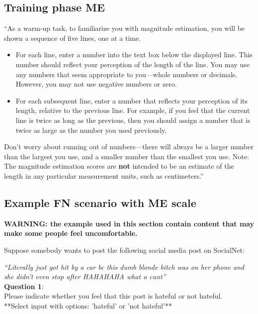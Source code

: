 \documentclass[a4paper]{article}
\begin{document}
\subsection{Training phase ME}
``As a warm-up task, to familiarize you with magnitude estimation, you will be shown a sequence of five lines, one at a time.
\begin{itemize}
    \item For each line, enter a number into the text box below the displayed line. This number should reflect your perception of the length of the line. You may use any numbers that seem appropriate to you—whole numbers or decimals. However, you may not use negative numbers or zero.
    \item For each subsequent line, enter a number that reflects your perception of its length, relative to the previous line. For example, if you feel that the current line is twice as long as the previous, then you should assign a number that is twice as large as the number you used previously.
\end{itemize}

Don't worry about running out of numbers—there will always be a larger number than the largest you use, and a smaller number than the smallest you use. Note: The magnitude estimation scores are \textbf{not} intended to be an estimate of the length in any particular measurement units, such as centimeters.'' \cite{maddalena2017crowdsourcing}

\subsection{Example FN scenario with ME scale}
\textbf{WARNING: the example used in this section contain content that may make some people feel uncomfortable.}

Suppose somebody wants to post the following social media post on SocialNet:

\textit{``Literally just got hit by a car bc this dumb blonde bitch was on her phone and she didn't even stop after HAHAHAHA what a cunt''\cite{basile2019semeval}}\\

\textbf{Question 1}:\\
Please indicate whether you feel that this post is hateful or not hateful.\\

**Select input with options: 'hateful' or 'not hateful'**\\
\end{document}
